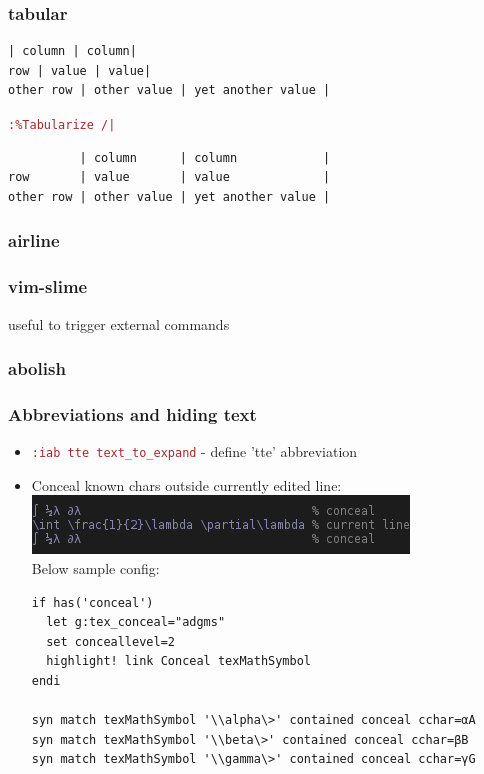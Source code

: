 \documentclass{beamer}
\newcommand{\vimcommand}[1]{\texttt{\textcolor{brown}{#1}}}
\begin{document}
\begin{frame}[fragile]
  \frametitle{tabular}
{\footnotesize
\begin{verbatim}
| column | column|
row | value | value|
other row | other value | yet another value |
\end{verbatim}
}
\vimcommand{:\%Tabularize /|}
{\footnotesize
\begin{verbatim}
          | column      | column            |
row       | value       | value             |
other row | other value | yet another value |
\end{verbatim}
}
\end{frame}

\begin{frame}
  \frametitle{airline}
\end{frame}

\begin{frame}
  \frametitle{vim-slime}
  useful to trigger external commands
\end{frame}


\begin{frame}
  \frametitle{abolish}
\end{frame}

\begin{frame}[fragile]
    \frametitle{Abbreviations and hiding text}
    \begin{itemize}
      \item \vimcommand{:iab tte text\_to\_expand} - define 'tte' abbreviation
        \item Conceal known chars outside currently edited line:\\
 \includegraphics[scale=0.6]{vim_conceal_example.png}\\
\textrm{Below sample config:}
{\footnotesize
\begin{verbatim}
if has('conceal')
  let g:tex_conceal="adgms"
  set conceallevel=2
  highlight! link Conceal texMathSymbol
endi

syn match texMathSymbol '\\alpha\>' contained conceal cchar=αA
syn match texMathSymbol '\\beta\>' contained conceal cchar=βB
syn match texMathSymbol '\\gamma\>' contained conceal cchar=γG
\end{verbatim}
}
    \end{itemize}
\end{frame}
\end{document}

